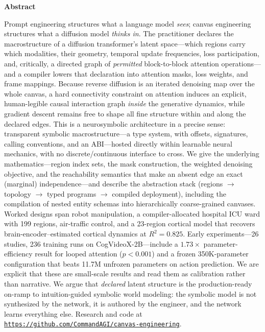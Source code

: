 \documentclass[10pt,twocolumn]{article}
\begin{document}
\begin{center}
\begin{minipage}{0.9\textwidth}
\noindent\textbf{Abstract}\par\vspace{0.35em}
\noindent\small
Prompt engineering structures what a language model \emph{sees}; canvas engineering structures what a diffusion model \emph{thinks in}. The practitioner declares the macrostructure of a diffusion transformer's latent space---which regions carry which modalities, their geometry, temporal update frequencies, loss participation, and, critically, a directed graph of \emph{permitted} block-to-block attention operations---and a compiler lowers that declaration into attention masks, loss weights, and frame mappings. Because reverse diffusion is an iterated denoising map over the whole canvas, a hard connectivity constraint on attention induces an explicit, human-legible causal interaction graph \emph{inside} the generative dynamics, while gradient descent remains free to shape all fine structure within and along the declared edges. This is a neurosymbolic architecture in a precise sense: transparent symbolic macrostructure---a type system, with offsets, signatures, calling conventions, and an ABI---hosted directly within learnable neural mechanics, with no discrete/continuous interface to cross. We give the underlying mathematics---region index sets, the mask construction, the weighted denoising objective, and the reachability semantics that make an absent edge an exact (marginal) independence---and describe the abstraction stack (regions $\rightarrow$ topology $\rightarrow$ typed programs $\rightarrow$ compiled deployment), including the compilation of nested entity schemas into hierarchically coarse-grained canvases. Worked designs span robot manipulation, a compiler-allocated hospital ICU ward with 199 regions, air-traffic control, and a 23-region cortical model that recovers brain-encoder--estimated cortical dynamics at $R^2=0.825$. Early experiments---26 studies, 236 training runs on CogVideoX-2B---include a $1.73\times$ parameter-efficiency result for looped attention ($p<0.001$) and a frozen 350K-parameter configuration that beats 11.7M unfrozen parameters on action prediction. We are explicit that these are small-scale results and read them as calibration rather than narrative. We argue that \emph{declared} latent structure is the production-ready on-ramp to intuition-guided symbolic world modeling: the symbolic model is not synthesized by the network, it is authored by the engineer, and the network learns everything else. Research and code at \href{https://github.com/commandAGI/canvas-engineering}{\texttt{https://github.com/CommandAGI/canvas-engineering}}.\par\normalsize
\end{minipage}
\end{center}
\end{document}
